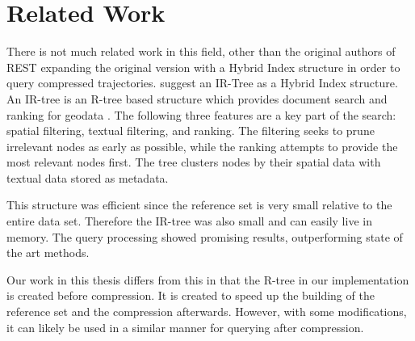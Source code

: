 \chapter{Related Work}
\label{chap:rel}
There is not much related work in this field, other than the original authors of REST expanding the original version with a Hybrid Index structure in order to query compressed trajectories. \textcite{zheng2019reference} suggest an IR-Tree as a Hybrid Index structure. An IR-tree is an R-tree based structure which provides document search and ranking for geodata \cite{li2010ir}. The following three features are a key part of the search: spatial filtering, textual filtering, and ranking. The filtering seeks to prune irrelevant nodes as early as possible, while the ranking attempts to provide the most relevant nodes first. The tree clusters nodes by their spatial data with textual data stored as metadata.

This structure was efficient since the reference set is very small relative to the entire data set. Therefore the IR-tree was also small and can easily live in memory. The query processing showed promising results, outperforming state of the art methods.

Our work in this thesis differs from this in that the R-tree in our implementation is created before compression. It is created to speed up the building of the reference set and the compression afterwards. However, with some modifications, it can likely be used in a similar manner for querying after compression.